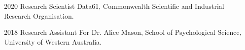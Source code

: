 

\begin{cvskills}

  \cvskill
    {2020} %
    {Research Scientist} %
    {Data61, Commonwealth Scientific and Industrial Research Organisation.} %

  \cvskill
    {2018} %
    {Research Assistant} %
    {For Dr. Alice Mason, School of Psychological Science, University of Western Australia.} %

\end{cvskills}
